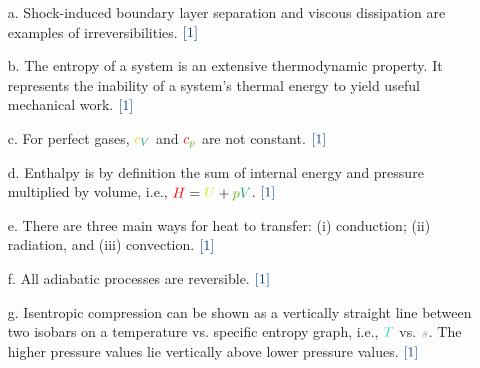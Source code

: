\documentclass[
  twocolumn,
  landscape]{report}
\begin{document}
\begin{enumerate}
\item[a.] Shock-induced boundary layer separation and viscous dissipation are examples of irreversibilities. ${\color[rgb]{0.028509,0.250925,0.501969}[1]}$

\item[b.] The entropy of a system is an extensive thermodynamic property. It represents the inability of a system's thermal energy to yield useful mechanical work. ${\color[rgb]{0.028509,0.250925,0.501969}[1]}$

\item[c.] For perfect gases, ${\color[rgb]{0.878548,0.880173,0.060757}c}_{\color[rgb]{0.079785,0.618358,0.483717}V}$ and ${\color[rgb]{0.986252,0.007236,0.027423}c}_{\color[rgb]{0.315209,0.728565,0.037706}p}$ are not constant. ${\color[rgb]{0.028509,0.250925,0.501969}[1]}$

\item[d.] Enthalpy is by definition the sum of internal energy and pressure multiplied by volume, i.e., ${\color[rgb]{0.986252,0.007236,0.027423}H} = {\color[rgb]{0.878548,0.880173,0.060757}U} + {\color[rgb]{0.315209,0.728565,0.037706}p}{\color[rgb]{0.079785,0.618358,0.483717}V}$. ${\color[rgb]{0.028509,0.250925,0.501969}[1]}$

\item[e.] There are three main ways for heat to transfer: (i) conduction; (ii) radiation, and (iii) convection. ${\color[rgb]{0.028509,0.250925,0.501969}[1]}$

\item[f.] All adiabatic processes are reversible. ${\color[rgb]{0.028509,0.250925,0.501969}[1]}$

\item[g.] Isentropic compression can be shown as a vertically straight line between two isobars on a temperature vs. specific entropy graph, i.e., ${\color[rgb]{0.164799,0.878862,0.723179}T}$ vs. ${\color[rgb]{0.599997,0.600015,0.600005}s}$. The higher pressure values lie vertically above lower pressure values. ${\color[rgb]{0.028509,0.250925,0.501969}[1]}$

\end{enumerate}
\end{document}
